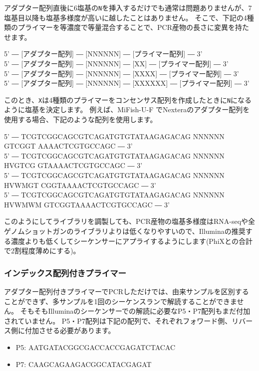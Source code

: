 \documentclass[titlepage,10pt,a4paper,uplatex]{jsbook}
\newenvironment{pre}{\begin{leftbar}\raggedright\ttfamily\footnotesize\setlength{\baselineskip}{1.4em}}{\end{leftbar}\vspace{-1em}}
\begin{document}
アダプター配列直後に6塩基の\texttt{N}を挿入するだけでも通常は問題ありませんが、7塩基目以降も塩基多様度が高いに越したことはありません。
そこで、下記の4種類のプライマーを等濃度で等量混合することで、PCR産物の長さに変異を持たせます。

\begin{pre}
5' ― [アダプター配列] ― [NNNNNN] ― [プライマー配列] ― 3'\\
5' ― [アダプター配列] ― [NNNNNN] ― [XX] ― [プライマー配列] ― 3'\\
5' ― [アダプター配列] ― [NNNNNN] ― [XXXX] ― [プライマー配列] ― 3'\\
5' ― [アダプター配列] ― [NNNNNN] ― [XXXXXX] ― [プライマー配列] ― 3'
\end{pre}

このとき、\texttt{X}は4種類のプライマーをコンセンサス配列を作成したときに\texttt{N}になるように塩基を決定します。
例えば、MiFish-U-F \citep{Miya2015}でNexteraのアダプター配列を使用する場合、下記のような配列を使用します。

\begin{pre}
5' ― TCGTCGGCAGCGTCAGATGTGTATAAGAGACAG NNNNNN GTCGGT AAAACTCGTGCCAGC ― 3'\\
5' ― TCGTCGGCAGCGTCAGATGTGTATAAGAGACAG NNNNNN HVGTCG GTAAAACTCGTGCCAGC ― 3'\\
5' ― TCGTCGGCAGCGTCAGATGTGTATAAGAGACAG NNNNNN HVWMGT CGGTAAAACTCGTGCCAGC ― 3'\\
5' ― TCGTCGGCAGCGTCAGATGTGTATAAGAGACAG NNNNNN HVWMWM GTCGGTAAAACTCGTGCCAGC ― 3'
\end{pre}

このようにしてライブラリを調製しても、PCR産物の塩基多様度はRNA-seqや全ゲノムショットガンのライブラリよりは低くなりやすいので、Illuminaの推奨する濃度よりも低くしてシーケンサーにアプライするようにします(PhiXとの合計で2割程度薄めにする)。

\subsubsection{インデックス配列付きプライマー}

アダプター配列付きプライマーでPCRしただけでは、由来サンプルを区別することができず、多サンプルを1回のシーケンスランで解読することができません。
そもそもIlluminaのシーケンサーでの解読に必要なP5・P7配列もまだ付加されていません。
P5・P7配列は下記の配列で、それぞれフォワード側、リバース側に付加させる必要があります。

\begin{itemize}
\item P5: AATGATACGGCGACCACCGAGATCTACAC
\item P7: CAAGCAGAAGACGGCATACGAGAT
\end{itemize}
\end{document}
